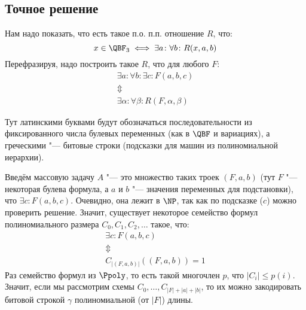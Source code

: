 \subsection{Точное решение}
	Нам надо показать, что есть такое п.о. п.п. отношение $R$, что:
	\[ x \in \QBF_3 \iff \exists a \colon \forall b \colon R(x, a, b) \]
	Перефразируя, надо построить такое $R$, что для любого $F$:
	\begin{gather*}
		\exists a \colon \forall b \colon \exists c \colon F(a, b, c) \\
		\Updownarrow \\
		\exists \alpha \colon \forall \beta \colon R(F, \alpha, \beta)
	\end{gather*}
	\begin{Rem}
		Тут латинскими буквами будут обозначаться последовательности из фиксированного числа
		булевых переменных (как в $\QBF$ и вариациях), а греческими "--- битовые строки
		(подсказки для машин из полиномиальной иерархии).
	\end{Rem}

	Введём массовую задачу $A$ "--- это множество таких троек $(F, a, b)$
	(тут $F$ "--- некоторая булева формула, а $a$ и $b$ "--- значения переменных для подстановки),
	что $\exists c \colon F(a, b, c)$.
	Очевидно, она лежит в $\NP$, так как по подсказке ($c$) можно проверить решение.
	Значит, существует некоторое семейство формул полиномиального размера $C_0, C_1, C_2, \dots$ такое, что:
	\begin{gather*}
		\exists c \colon F(a, b, c) \\
		\Updownarrow \\
		C_{|(F, a, b)|}((F, a, b)) = 1
	\end{gather*}
	Раз семейство формул из $\Ppoly$, то есть такой многочлен $p$, что $|C_i| \le p(i)$.
	Значит, если мы рассмотрим схемы $C_0, \dots, C_{|F|+|a|+|b|}$, то их можно закодировать битовой
	строкой $\gamma$ полиномиальной (от $|F|$) длины.

